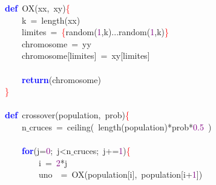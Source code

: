 \noindent
\mbox{}\textbf{\textcolor{Blue}{def}}\ OX\textcolor{BrickRed}{(}xx\textcolor{BrickRed}{,}\ xy\textcolor{BrickRed}{)}\textcolor{Red}{\{} \\
\mbox{}\ \ \ \ k\ \textcolor{BrickRed}{=}\ length\textcolor{BrickRed}{(}xx\textcolor{BrickRed}{)} \\
\mbox{}\ \ \ \ limites\ \textcolor{BrickRed}{=}\ \textcolor{Red}{\{}random\textcolor{BrickRed}{(}\textcolor{Purple}{1}\textcolor{BrickRed}{,}k\textcolor{BrickRed}{)...}random\textcolor{BrickRed}{(}\textcolor{Purple}{1}\textcolor{BrickRed}{,}k\textcolor{BrickRed}{)}\textcolor{Red}{\}} \\
\mbox{}\ \ \ \ chromosome\ \textcolor{BrickRed}{=}\ yy \\
\mbox{}\ \ \ \ chromosome\textcolor{BrickRed}{[}limites\textcolor{BrickRed}{]}\ \textcolor{BrickRed}{=}\ xy\textcolor{BrickRed}{[}limites\textcolor{BrickRed}{]} \\
\mbox{} \\
\mbox{}\ \ \ \ \textbf{\textcolor{Blue}{return}}\textcolor{BrickRed}{(}chromosome\textcolor{BrickRed}{)} \\
\mbox{}\textcolor{Red}{\}} \\
\mbox{} \\
\mbox{}\textbf{\textcolor{Blue}{def}}\ crossover\textcolor{BrickRed}{(}population\textcolor{BrickRed}{,}\ prob\textcolor{BrickRed}{)}\textcolor{Red}{\{} \\
\mbox{}\ \ \ \ n$\_$cruces\ \textcolor{BrickRed}{=}\ ceiling\textcolor{BrickRed}{(}\ length\textcolor{BrickRed}{(}population\textcolor{BrickRed}{)*}prob\textcolor{BrickRed}{*}\textcolor{Purple}{0.5}\ \textcolor{BrickRed}{)} \\
\mbox{} \\
\mbox{}\ \ \ \ \textbf{\textcolor{Blue}{for}}\textcolor{BrickRed}{(}j\textcolor{BrickRed}{=}\textcolor{Purple}{0}\textcolor{BrickRed}{;}\ j\textcolor{BrickRed}{\textless{}}n$\_$cruces\textcolor{BrickRed}{;}\ j\textcolor{BrickRed}{+=}\textcolor{Purple}{1}\textcolor{BrickRed}{)}\textcolor{Red}{\{} \\
\mbox{}\ \ \ \ \ \ \ \ i\ \textcolor{BrickRed}{=}\ \textcolor{Purple}{2}\textcolor{BrickRed}{*}j \\
\mbox{}\ \ \ \ \ \ \ \ uno\ \ \textcolor{BrickRed}{=}\ OX\textcolor{BrickRed}{(}population\textcolor{BrickRed}{[}i\textcolor{BrickRed}{],}\ population\textcolor{BrickRed}{[}i\textcolor{BrickRed}{+}\textcolor{Purple}{1}\textcolor{BrickRed}{])} \\
